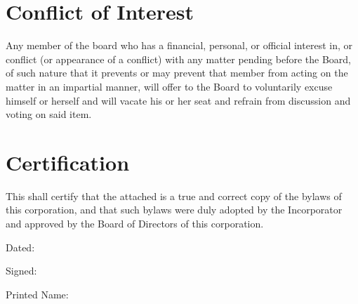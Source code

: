 \documentclass{article}
\begin{document}
\section{Conflict of Interest}
  Any member of the board who has a financial, personal, or official interest in, or conflict
  (or appearance of a conflict) with any matter pending before the Board, of such nature that it
  prevents or may prevent that member from acting on the matter in an impartial manner,
  will offer to the Board to voluntarily excuse himself or herself and will vacate his or her seat
  and refrain from discussion and voting on said item.
\section{Certification}
  This shall certify that the attached is a true and correct copy of the bylaws of this
  corporation, and that such bylaws were duly adopted by the Incorporator and approved by
  the Board of Directors of this corporation.

Dated:

Signed:

Printed Name:
\end{document}
